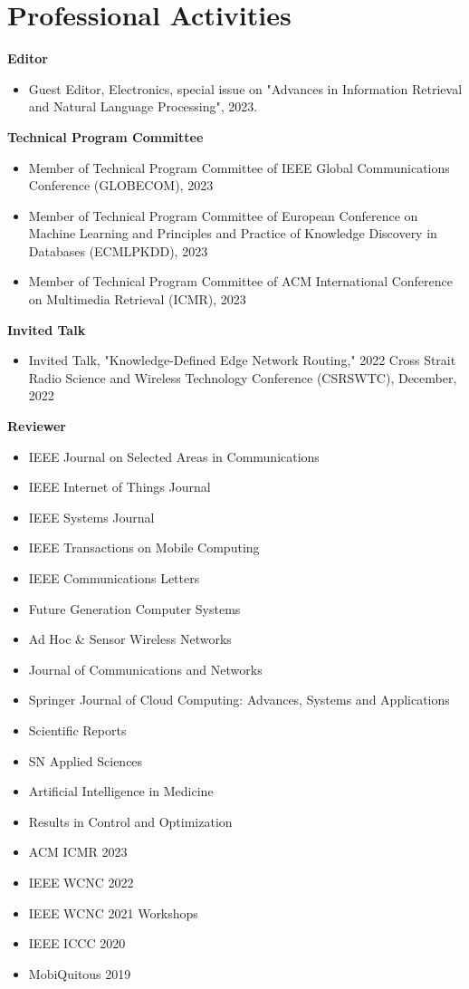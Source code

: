 \documentclass[letterpaper,11pt]{article}
\newcommand{\contentlength}{5.5in}
\begin{document}
	\section{\textbf{Professional Activities}}
	\begin{tcolorbox}[flush right,breakable,colback=white,colframe=white,width=\contentlength]
		\textbf{Editor}
		\begin{itemize}
			\item Guest Editor, Electronics, special issue on "Advances in Information Retrieval and Natural Language Processing", 2023.
		\end{itemize}
		\textbf{Technical Program Committee}
		\begin{itemize}
			\item Member of Technical Program Committee of IEEE Global Communications Conference (GLOBECOM), 2023
			\item Member of Technical Program Committee of European Conference on Machine Learning and Principles and Practice of Knowledge Discovery in Databases (ECMLPKDD), 2023
			\item Member of Technical Program Committee of ACM International Conference on Multimedia Retrieval (ICMR), 2023
		\end{itemize}
		
		\textbf{Invited Talk}
		\begin{itemize}
			\item Invited Talk, "Knowledge-Defined Edge Network Routing," 2022 Cross Strait Radio Science and Wireless Technology Conference (CSRSWTC), December, 2022
		\end{itemize}
	
		\textbf{Reviewer}
		\begin{itemize}[itemsep=0mm]
			\item IEEE Journal on Selected Areas in Communications
			\item IEEE Internet of Things Journal
			\item IEEE Systems Journal
			\item IEEE Transactions on Mobile Computing
			\item IEEE Communications Letters
			\item Future Generation Computer Systems
			\item Ad Hoc \& Sensor Wireless Networks
			\item Journal of Communications and Networks
			\item Springer Journal of Cloud Computing: Advances, Systems and Applications
			\item Scientific Reports
			\item SN Applied Sciences
			\item Artificial Intelligence in Medicine
			\item Results in Control and Optimization
			\item ACM ICMR 2023
			\item IEEE WCNC 2022
			\item IEEE WCNC 2021 Workshops
			\item IEEE ICCC 2020
			\item MobiQuitous 2019
		\end{itemize}
	\end{tcolorbox}
	
\end{document}
